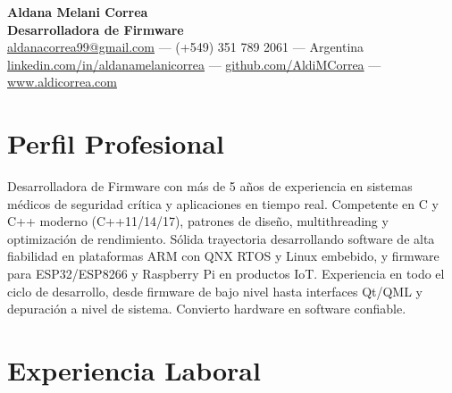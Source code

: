 \documentclass[11pt,a4paper]{article}
\begin{document}
\begin{center}
    {\LARGE\textbf{Aldana Melani Correa}}\\[4pt]
    {\large\textbf{Desarrolladora de Firmware}}\\[6pt]
    \href{mailto:aldanacorrea99@gmail.com}{aldanacorrea99@gmail.com} --- (+549) 351 789 2061 --- Argentina\\[2pt]
    \href{https://linkedin.com/in/aldanamelanicorrea}{linkedin.com/in/aldanamelanicorrea} ---
    \href{https://github.com/AldiMCorrea}{github.com/AldiMCorrea} ---
    \href{https://www.aldicorrea.com}{www.aldicorrea.com}
\end{center}

\section{Perfil Profesional}
Desarrolladora de Firmware con m\'{a}s de 5 a\~{n}os de experiencia en sistemas m\'{e}dicos de seguridad cr\'{i}tica y aplicaciones en tiempo real. Competente en C y C++ moderno (C++11/14/17), patrones de dise\~{n}o, multithreading y optimizaci\'{o}n de rendimiento. S\'{o}lida trayectoria desarrollando software de alta fiabilidad en plataformas ARM con QNX RTOS y Linux embebido, y firmware para ESP32/ESP8266 y Raspberry Pi en productos IoT. Experiencia en todo el ciclo de desarrollo, desde firmware de bajo nivel hasta interfaces Qt/QML y depuraci\'{o}n a nivel de sistema. Convierto hardware en software confiable.

\section{Experiencia Laboral}
\end{document}
